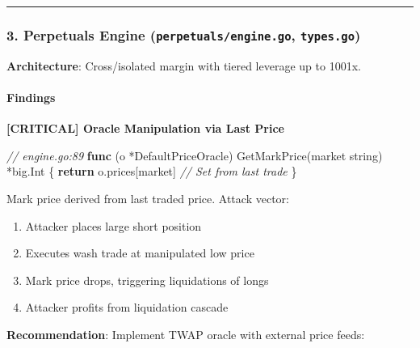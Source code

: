 \documentclass[
]{article}
\newenvironment{Shaded}{}{}
\newcommand{\CommentTok}[1]{\textcolor[rgb]{0.38,0.63,0.69}{\textit{#1}}}
\newcommand{\ControlFlowTok}[1]{\textcolor[rgb]{0.00,0.44,0.13}{\textbf{#1}}}
\newcommand{\DataTypeTok}[1]{\textcolor[rgb]{0.56,0.13,0.00}{#1}}
\newcommand{\KeywordTok}[1]{\textcolor[rgb]{0.00,0.44,0.13}{\textbf{#1}}}
\newcommand{\NormalTok}[1]{#1}
\newcommand{\OperatorTok}[1]{\textcolor[rgb]{0.40,0.40,0.40}{#1}}
\providecommand{\tightlist}{%
  \setlength{\itemsep}{0pt}\setlength{\parskip}{0pt}}
\begin{document}
\begin{center}\rule{0.5\linewidth}{0.5pt}\end{center}

\subsubsection{\texorpdfstring{3. Perpetuals Engine
(\texttt{perpetuals/engine.go},
\texttt{types.go})}{3. Perpetuals Engine (perpetuals/engine.go, types.go)}}\label{3-perpetuals-engine-perpetualsenginego-typesgo}

\textbf{Architecture}: Cross/isolated margin with tiered leverage up to
1001x.

\paragraph{Findings}\label{findings-2}

\textbf{{[}CRITICAL{]} Oracle Manipulation via Last Price}

\begin{Shaded}
\begin{Highlighting}[]
\CommentTok{// engine.go:89}
\KeywordTok{func} \OperatorTok{(}\NormalTok{o }\OperatorTok{*}\NormalTok{DefaultPriceOracle}\OperatorTok{)}\NormalTok{ GetMarkPrice}\OperatorTok{(}\NormalTok{market }\DataTypeTok{string}\OperatorTok{)} \OperatorTok{*}\NormalTok{big}\OperatorTok{.}\NormalTok{Int }\OperatorTok{\{}
    \ControlFlowTok{return}\NormalTok{ o}\OperatorTok{.}\NormalTok{prices}\OperatorTok{[}\NormalTok{market}\OperatorTok{]} \CommentTok{// Set from last trade}
\OperatorTok{\}}
\end{Highlighting}
\end{Shaded}

Mark price derived from last traded price. Attack vector:

\begin{enumerate}
\def\labelenumi{\arabic{enumi}.}
\tightlist
\item
  Attacker places large short position
\item
  Executes wash trade at manipulated low price
\item
  Mark price drops, triggering liquidations of longs
\item
  Attacker profits from liquidation cascade
\end{enumerate}

\textbf{Recommendation}: Implement TWAP oracle with external price
feeds:
\end{document}
